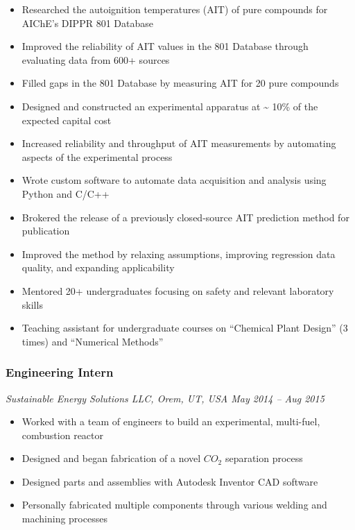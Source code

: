 \begin{itemize}
\tightlist
\item
  Researched the autoignition temperatures (AIT) of pure compounds for
  AIChE's DIPPR 801 Database
\item
  Improved the reliability of AIT values in the 801 Database through
  evaluating data from 600+ sources
\item
  Filled gaps in the 801 Database by measuring AIT for 20 pure compounds
\item
  Designed and constructed an experimental apparatus at
  \textasciitilde{} 10\% of the expected capital cost
\item
  Increased reliability and throughput of AIT measurements by automating
  aspects of the experimental process
\item
  Wrote custom software to automate data acquisition and analysis using
  Python and C/C++
\item
  Brokered the release of a previously closed-source AIT prediction
  method for publication
\item
  Improved the method by relaxing assumptions, improving regression data
  quality, and expanding applicability
\item
  Mentored 20+ undergraduates focusing on safety and relevant laboratory
  skills
\item
  Teaching assistant for undergraduate courses on ``Chemical Plant
  Design'' (3 times) and ``Numerical Methods''
\end{itemize}

\subsubsection{Engineering Intern}\label{engineering-intern}

\emph{Sustainable Energy Solutions LLC, Orem, UT, USA \textbar{} May
2014 -- Aug 2015}

\begin{itemize}
\tightlist
\item
  Worked with a team of engineers to build an experimental, multi-fuel,
  combustion reactor
\item
  Designed and began fabrication of a novel \(CO_2\)\hspace{0pt}
  separation process
\item
  Designed parts and assemblies with Autodesk Inventor CAD software
\item
  Personally fabricated multiple components through various welding and
  machining processes
\end{itemize}

